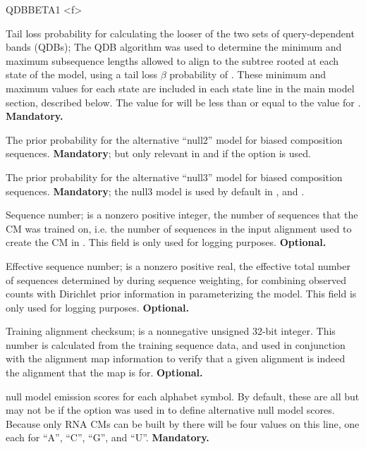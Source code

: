 \begin{sreitems}{QDBBETA1 <f>}
\item [\emprog{QDBBETA2 <f>}] Tail loss probability for calculating
  the looser of the two sets of query-dependent bands (QDBs); The QDB
  algorithm \citep{NawrockiEddy07} was used to determine the minimum
  and maximum subsequence lengths allowed to align to the subtree
  rooted at each state of the model, using a tail loss $\beta$
  probability of . These minimum and maximum values for each state
  are included in each state line in the main model section, described
  below. The  value for  will be less than
  or equal to the  value for .
  \textbf{Mandatory.}

\item [\emprog{N2OMEGA <f>}] The prior probability for the alternative
  ``null2'' model for biased composition
  sequences. \textbf{Mandatory}; but only relevant in  and
   if the  option is used.

\item [\emprog{N3OMEGA <f>}] The prior probability for the alternative
  ``null3'' model for biased composition
  sequences. \textbf{Mandatory}; the null3 model is used by default in 
  ,  and .

\item [\emprog{NSEQ <d>}] Sequence number;  is a nonzero
positive integer, the number of sequences that the CM was trained on,
i.e. the number of sequences in the input alignment used to create the
CM in .  This field is only used for logging
purposes.  \textbf{Optional.}

\item [\emprog{EFFN <f>}] Effective sequence number;  is a
nonzero positive real, the effective total number of sequences
determined by  during sequence weighting, for combining
observed counts with Dirichlet prior information in parameterizing the
model. This field is only used for logging purposes.
\textbf{Optional.}

\item [\emprog{CKSUM <d>}] Training alignment checksum;  is
  a nonnegative unsigned 32-bit integer. This number is calculated
  from the training sequence data, and used in conjunction with the
  alignment map information to verify that a given alignment is indeed
  the alignment that the map is for. \textbf{Optional.}

\item [\emprog{NULL <f> <f> <f> <f>}] null model emission scores for
  each alphabet symbol. By default, these are all  but may
  not be if the  option was used in  to
  define alternative null model scores. Because only RNA CMs can be
  built by  there will be four values on this line, one
  each for ``A'', ``C'', ``G'', and ``U''. \textbf{Mandatory.}


\end{sreitems}
